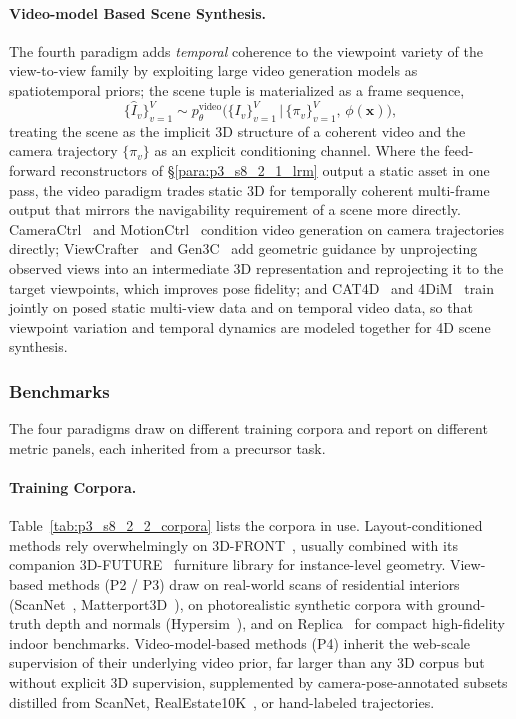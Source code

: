 \paragraph{Video-model Based Scene Synthesis.}
\label{para:p3_s8_2_2_video}
The fourth paradigm adds \emph{temporal} coherence to the viewpoint variety of the view-to-view family by exploiting large video generation models as spatiotemporal priors; the scene tuple is materialized as a frame sequence,
\begin{equation}
\{\hat{I}_v\}_{v=1}^V \sim p_\theta^{\text{video}}\!\Big(\{I_v\}_{v=1}^V \,\Big|\, \{\pi_v\}_{v=1}^V,\,\phi(\mathbf{x})\Big),
\label{eq:p3_s8_2_2_video_objective}
\end{equation}
treating the scene as the implicit 3D structure of a coherent video and the camera trajectory $\{\pi_v\}$ as an explicit conditioning channel.
Where the feed-forward reconstructors of §\ref{para:p3_s8_2_1_lrm} output a static asset in one pass, the video paradigm trades static 3D for temporally coherent multi-frame output that mirrors the navigability requirement of a scene more directly.
CameraCtrl~\cite{he2024cameractrl} and MotionCtrl~\cite{wang2024motionctrl} condition video generation on camera trajectories directly; ViewCrafter~\cite{yu2024viewcrafter} and Gen3C~\cite{ren2025gen3c} add geometric guidance by unprojecting observed views into an intermediate 3D representation and reprojecting it to the target viewpoints, which improves pose fidelity; and CAT4D~\cite{wu2025cat4d} and 4DiM~\cite{watson2024controlling} train jointly on posed static multi-view data and on temporal video data, so that viewpoint variation and temporal dynamics are modeled together for 4D scene synthesis.


\subsubsection{Benchmarks}
\label{subsubsec:p3_s8_2_2_benchmarks}

The four paradigms draw on different training corpora and report on different metric panels, each inherited from a precursor task.

\paragraph{Training Corpora.}
Table~\ref{tab:p3_s8_2_2_corpora} lists the corpora in use.
Layout-conditioned methods rely overwhelmingly on 3D-FRONT~\cite{fu20213dfront}, usually combined with its companion 3D-FUTURE~\cite{fu20213dfuture} furniture library for instance-level geometry.
View-based methods (P2 / P3) draw on real-world scans of residential interiors (ScanNet~\cite{dai2017scannet}, Matterport3D~\cite{chang2017matterport3d}), on photorealistic synthetic corpora with ground-truth depth and normals (Hypersim~\cite{roberts2021hypersim}), and on Replica~\cite{straub2019replica} for compact high-fidelity indoor benchmarks.
Video-model-based methods (P4) inherit the web-scale supervision of their underlying video prior, far larger than any 3D corpus but without explicit 3D supervision, supplemented by camera-pose-annotated subsets distilled from ScanNet, RealEstate10K~\cite{zhou2018stereo}, or hand-labeled trajectories.

